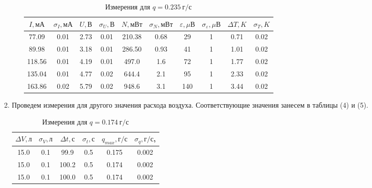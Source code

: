 \documentclass[12pt,a4paper]{article}
\begin{document}
\begin{enumerate}
\begin{enumerate}
        \begin{table}[ht!]
        \begin{center}
        \begin{tabular}{|c|c|c|c|c|c|c|c|c|c|}
        \hline
        $I, мА$ & $\sigma_I, мА$ & $U, В$ & $\sigma_U, В$ & $N, мВт$ & $\sigma_N, мВт$ & $\varepsilon, \mu В$ & $\sigma_\varepsilon, \mu В$ & $\Delta T, K$ & $\sigma_T, K$ \\ \hline
                77.09&  0.01&  2.73& 0.01 &  210.38&  0.68& 29 &1  & 0.71 &    0.02          
                \\ \hline
                89.98&  0.01&3.18  &  0.01&  286.50&  0.93& 41 &1  &  1.01& 0.02
                \\ \hline
                118.56&  0.01&4.19  &  0.01&  497.0&  1.6&72  & 1 &  1.77&               0.02
                \\ \hline
                135.04&  0.01&4.77  &  0.02& 644.4 & 2.1 &95 & 1 &  2.33&             0.02  
                \\ \hline
                163.86&  0.02&5.79  & 0.02 &  948.6&  3.1&140  &1  & 3.44 &0.02
                \\ \hline
        \end{tabular}
        \caption{Измерения для $q=0.235\ г/с$}
        \end{center}
        \end{table}
    \end{enumerate}
    \item Проведем измерения для другого значения расхода воздуха. Соответствующие значения занесем в таблицы (4) и (5).
     \begin{table}[ht!]
    \begin{center}
    \begin{tabular}{|c|c|c|c|c|c|}
    \hline
    $\Delta V,  л$ & $\sigma_V, л$ & $\Delta t, с$ & $\sigma_t, с$ & $q_{max}, г/с$ & $\sigma_q, г/с$, \\ \hline
        15.0 &   0.1&  99.9&   0.5&   0.175&    0.002   
        \\ \hline
        15.0&   0.1&   100.2&   0.5&  0.174 &        0.002          
        \\ \hline
        15.0&  0.1 &   100.0&   0.5&   0.174&             0.002     
        \\ \hline
    \end{tabular}
    \caption{Измерения для $q=0.174\ г/с$}
    \end{center}
    \end{table}
    

\end{enumerate}
\end{document}
